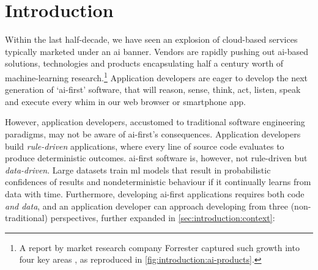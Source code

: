 \chapter{Introduction}
\label{ch:introduction}
\graphicspath{{mainmatter/introduction/figures/}}

Within the last half-decade, we have seen an explosion of cloud-based services typically marketed under an \gls{ai} banner. 
Vendors are rapidly pushing out \gls{ai}-based solutions, technologies and products encapsulating half a century worth of machine-learning research.\footnote{A \citeyear{LoGiudice:2016wf} report by market research company Forrester captured such growth into four key areas \citep{LoGiudice:2016wf}, as reproduced in  \cref{fig:introduction:ai-products}.}
Application developers are eager to develop the next generation of `\gls{ai}-first' software, that will reason, sense, think, act, listen, speak and execute every whim in our web browser or smartphone app.

However, application developers, accustomed to traditional software engineering paradigms, may not be aware of \gls{ai}-first's consequences. Application developers build \textit{rule-driven} applications, where every line of source code evaluates to produce deterministic outcomes. 
\Gls{ai}-first software is, however, not rule-driven but \textit{data-driven}. Large datasets train \gls{ml} models that result in probabilistic confidences of results and nondeterministic behaviour if it continually learns from data with time. Furthermore, developing \gls{ai}-first applications requires both code \textit{and data}, and an application developer can approach developing from three (non-traditional) perspectives, further expanded in \cref{sec:introduction:context}:

